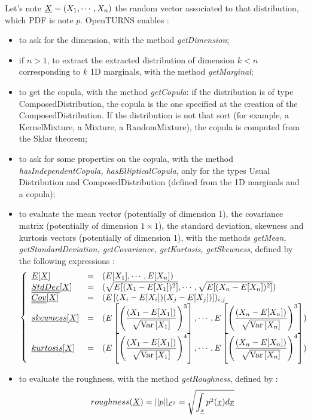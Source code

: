 Let's note ${\underline{X}} = (X_1, \cdots, X_n)$ the random vector associated to that distribution, which PDF is note $p$. OpenTURNS enables :
\begin{itemize}
\item to ask for the dimension, with the method {\itshape getDimension};
\item if $n >1$, to extract the extracted distribution of dimension $k<n$ corresponding to $k$ 1D marginals, with the method {\itshape getMarginal};
\item to get the copula, with the method {\itshape getCopula}: if the distribution is of type ComposedDistribution, the copula is the one specified at the creation of the ComposedDistribution. If the distribution is not that sort (for example, a KernelMixture, a Mixture, a RandomMixture), the copula is computed from the Sklar theorem;
\item to ask for some properties on the copula, with the method {\itshape hasIndependentCopula, hasEllipticalCopula}, only for the types Usual Distribution and ComposedDistribution (defined from the 1D marginals and a copula);
\item to evaluate the mean vector (potentially of dimension 1), the covariance matrix (potentially of dimension $1\times 1$), the standard deviation, skewness and kurtosis vectors (potentially of dimension 1), with the methods {\itshape getMean, getStandardDeviation, getCovariance, getKurtosis, getSkewness}, defined by the following expressions :
  \begin{align*}
    \left\{
      \begin{array}{lcl}
        \displaystyle {\underline{E}}[{\underline{X}}] & = & \displaystyle (E[X_1], \cdots, E[X_n]) \\
        \displaystyle {\underline{\underline{StdDev}}}[{\underline{X}}] & = & \displaystyle (\sqrt{E[(X_1-E[X_1])^2]}, \cdots, \sqrt{E[(X_n-E[X_n])^2]}) \\
        \displaystyle {\underline{\underline{Cov}}}[{\underline{X}}] & = & \displaystyle (E\left[(X_i-E[X_i])(X_j-E[X_j])\right])_{i,j} \\
        \displaystyle {\underline{skewness}}[{\underline{X}}] & = & \displaystyle (E\left[\left(\frac{(X_1-E[X_1])}{\sqrt{{\rm Var}\left[ X_1 \right]}}\right)^3\right], \cdots, E\left[\left(\frac{(X_n-E[X_n])}{\sqrt{{\rm Var}\left[ X_n \right]}}\right)^3\right]) \\
        \displaystyle {\underline{kurtosis}}[{\underline{X}}] & = & \displaystyle (E\left[\left(\frac{(X_1-E[X_1])}{\sqrt{{\rm Var}\left[ X_1 \right]}}\right)^4\right], \cdots, E\left[\left(\frac{(X_n-E[X_n])}{\sqrt{{\rm Var}\left[ X_n \right]}}\right)^4\right])
      \end{array}
    \right.
  \end{align*}
\item to evaluate the roughness, with the method {\itshape getRoughness}, defined by :
  \begin{align*}
    roughness({\underline{X}}) = ||p||_{{\mathcal L}^2} = \sqrt{\int_{\underline{x}} p^2({\underline{x}})d{\underline{x}}}
  \end{align*}


\end{itemize}
